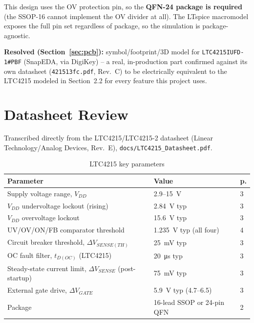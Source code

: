 \documentclass[11pt,letterpaper]{article}
\begin{document}
This design uses the OV protection pin, so the \textbf{QFN-24 package is required} (the SSOP-16 cannot
implement the OV divider at all). The LTspice macromodel exposes the full pin set regardless of package,
so the simulation is package-agnostic.

\textbf{Resolved (Section~\ref{sec:pcb}):} symbol/footprint/3D model for \texttt{LTC4215IUFD-1\#PBF}
(SnapEDA, via DigiKey) -- a real, in-production part confirmed against its own datasheet
(\texttt{421513fc.pdf}, Rev.\ C) to be electrically equivalent to the LTC4215 modeled in Section~2.2 for
every feature this project uses.

\section{Datasheet Review}

Transcribed directly from the LTC4215/LTC4215-2 datasheet (Linear Technology/Analog Devices, Rev.\ E),
\texttt{docs/LTC4215\_Datasheet.pdf}.

\begin{table}[H]
\centering
\small
\caption{LTC4215 key parameters}
\begin{tabular}{@{}p{7cm}p{4cm}p{1cm}@{}}
\toprule
\textbf{Parameter} & \textbf{Value} & \textbf{p.} \\
\midrule
Supply voltage range, $V_{DD}$ & \SI{2.9}{}--\SI{15}{\volt} & 3 \\
$V_{DD}$ undervoltage lockout (rising) & \SI{2.84}{\volt} typ & 3 \\
$V_{DD}$ overvoltage lockout & \SI{15.6}{\volt} typ & 3 \\
UV/OV/ON/FB comparator threshold & \SI{1.235}{\volt} typ (all four) & 4 \\
Circuit breaker threshold, $\Delta V_{SENSE(TH)}$ & \SI{25}{\milli\volt} typ & 3 \\
OC fault filter, $t_{D(OC)}$ (LTC4215) & \SI{20}{\micro\second} typ & 3 \\
Steady-state current limit, $\Delta V_{SENSE}$ (post-startup) & \SI{75}{\milli\volt} typ & 3 \\
External gate drive, $\Delta V_{GATE}$ & \SI{5.9}{\volt} typ (4.7--6.5) & 3 \\
Package & 16-lead SSOP or 24-pin QFN & 2 \\
\bottomrule
\end{tabular}
\end{table}
\end{document}
